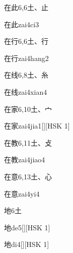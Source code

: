 \begin{entry}{在此}{6,6}{⼟、⽌}
  \begin{phonetics}{在此}{zai4ci3}
  \end{phonetics}
\end{entry}

\begin{entry}{在行}{6,6}{⼟、⾏}
  \begin{phonetics}{在行}{zai4hang2}
  \end{phonetics}
\end{entry}

\begin{entry}{在线}{6,8}{⼟、⽷}
  \begin{phonetics}{在线}{zai4xian4}
  \end{phonetics}
\end{entry}

\begin{entry}{在家}{6,10}{⼟、⼧}
  \begin{phonetics}{在家}{zai4jia1}[][HSK 1]
  \end{phonetics}
\end{entry}

\begin{entry}{在教}{6,11}{⼟、⽁}
  \begin{phonetics}{在教}{zai4jiao4}
  \end{phonetics}
\end{entry}

\begin{entry}{在意}{6,13}{⼟、⼼}
  \begin{phonetics}{在意}{zai4yi4}
  \end{phonetics}
\end{entry}

\begin{entry}{地}{6}{⼟}
  \begin{phonetics}{地}{de5}[][HSK 1]
  \end{phonetics}
  \begin{phonetics}{地}{di4}[][HSK 1]
  \end{phonetics}
\end{entry}

